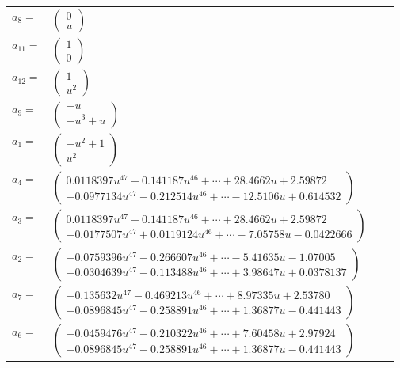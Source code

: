 \documentclass[1p]{elsarticle_modified}
\theoremstyle{definition}
\begin{document}
\begin{tabular}{m{7pt} m{180pt} m{7pt} m{180pt} }
\flushright $a_{8}=$&$\begin{pmatrix}0\\u\end{pmatrix}$ \\
\flushright $a_{11}=$&$\begin{pmatrix}1\\0\end{pmatrix}$ \\
\flushright $a_{12}=$&$\begin{pmatrix}1\\u^2\end{pmatrix}$ \\
\flushright $a_{9}=$&$\begin{pmatrix}- u\\- u^3+u\end{pmatrix}$ \\
\flushright $a_{1}=$&$\begin{pmatrix}- u^2+1\\u^2\end{pmatrix}$ \\
\flushright $a_{4}=$&$\begin{pmatrix}0.0118397 u^{47}+0.141187 u^{46}+\cdots+28.4662 u+2.59872\\-0.0977134 u^{47}-0.212514 u^{46}+\cdots-12.5106 u+0.614532\end{pmatrix}$ \\
\flushright $a_{3}=$&$\begin{pmatrix}0.0118397 u^{47}+0.141187 u^{46}+\cdots+28.4662 u+2.59872\\-0.0177507 u^{47}+0.0119124 u^{46}+\cdots-7.05758 u-0.0422666\end{pmatrix}$ \\
\flushright $a_{2}=$&$\begin{pmatrix}-0.0759396 u^{47}-0.266607 u^{46}+\cdots-5.41635 u-1.07005\\-0.0304639 u^{47}-0.113488 u^{46}+\cdots+3.98647 u+0.0378137\end{pmatrix}$ \\
\flushright $a_{7}=$&$\begin{pmatrix}-0.135632 u^{47}-0.469213 u^{46}+\cdots+8.97335 u+2.53780\\-0.0896845 u^{47}-0.258891 u^{46}+\cdots+1.36877 u-0.441443\end{pmatrix}$ \\
\flushright $a_{6}=$&$\begin{pmatrix}-0.0459476 u^{47}-0.210322 u^{46}+\cdots+7.60458 u+2.97924\\-0.0896845 u^{47}-0.258891 u^{46}+\cdots+1.36877 u-0.441443\end{pmatrix}$ \\

\end{tabular}
\end{document}
